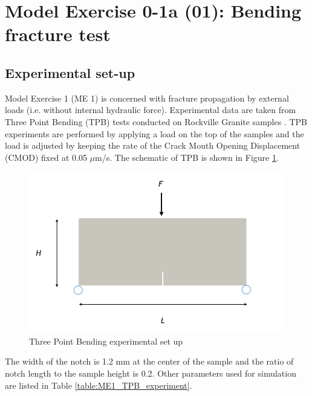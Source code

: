 \section{Model Exercise 0-1a (01): Bending fracture test}
\label{sec:mex01}
\subsection{Experimental set-up}
Model Exercise 1 (ME 1) is concerned with fracture propagation by external loads (i.e. without internal hydraulic force). Experimental data are taken from Three Point Bending (TPB) tests conducted on Rockville Granite samples \cite{Tarokh2016161}. TPB experiments are performed by applying a load on the top of the samples and the load is adjusted by keeping the rate of the Crack Mouth Opening Displacement (CMOD) fixed at 0.05 $\mu$m/s.
The schematic of TPB is shown in Figure \ref{fig:ME1_TPB_experiment}.

\begin{figure}[!ht]
\centering
\includegraphics[width=1\textwidth]{figures/TPB_exp.png}
\caption{Three Point Bending experimental set up}
\label{fig:ME1_TPB_experiment}
\end{figure}

The width of the notch is 1.2 mm at the center of the sample and the ratio of notch length to the sample height is 0.2. 
Other parameters used for simulation are listed in Table \ref{table:ME1_TPB_experiment}.

